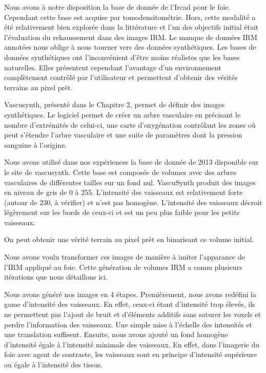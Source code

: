 Nous avons à notre disposition la base de donnée de l'Ircad pour le foie. Cependant cette base est acquise par tomodensitométrie. Hors, cette modalité a été relativement bien explorée dans la littérature et l'un des objectifs initial était l'évaluation du rehaussement dans des images IRM. Le manque de données IRM annotées nous oblige à nous tourner vers des données synthétiques. Les bases de données synthétiques ont l'inconvénient d'être moins réalistes que les bases naturelles. Elles présentent cependant l'avantage d'un environnement complètement contrôlé par l'utilisateur et permettent d'obtenir des vérités terrains au pixel prêt.

Vascusynth, présenté dans le Chapitre 2, permet de définir des images synthétiques. Le logiciel permet de créer un arbre vasculaire en précisant le nombre d'extrémités de celui-ci, une carte d'oxygénation contrôlant les zones où peut s'étendre l'arbre vasculaire et une suite de paramètres dont la pression sanguine à l'origine.

Nous avons utilisé dans nos expériences la base de donnée de 2013 disponible sur le site de vascusynth. Cette base est composée de volumes avec des arbres vasculaires de différentes tailles sur un fond nul. VascuSynth produit des images en niveau de gris de 0 à 255. L'intensité des vaisseaux est relativement forte (autour de 230, à vérifier) et n'est pas homogène. L'intensité des vaisseaux décroit légèrement sur les bords de ceux-ci et est un peu plus faible pour les petits vaisseaux.

On peut obtenir une vérité terrain au pixel prêt en binarisant ce volume initial.

Nous avons voulu transformer ces images de manière à imiter l'apparance de l'IRM appliqué au foie. Cette génération de volumes IRM a connu plusieurs itérations que nous détaillons ici.

Nous avons généré nos images en 4 étapes.
Premièrement, nous avons redéfini la game d'intensité des vaisseaux. En effet, ceux-ci étant d'intensité trop élevés, ils ne permettent pas l'ajout de bruit et d'éléments additifs sans saturer les voxels et perdre l'information des vaisseaux. Une simple mise à l'échelle des intensités et une translation suffisent. Ensuite, nous avons ajouté un fond homogène d'intensité égale à l'intensité minimale des vaisseaux. En effet, dans l'imagerie du foie avec agent de contraste, les vaisseaux sont en principe d'intensité supérieure ou égale à l'intensité des tissus.


